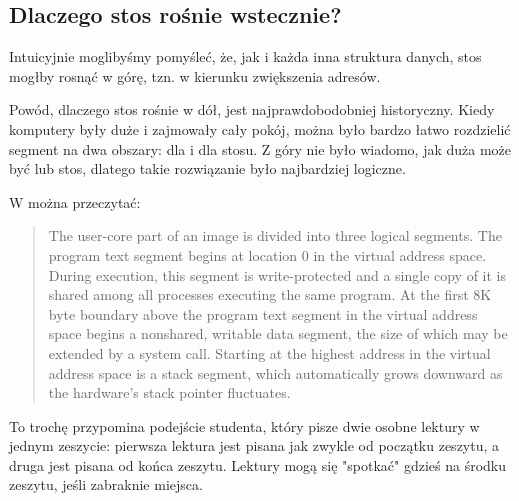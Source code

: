 \subsection{Dlaczego stos rośnie wstecznie?}
\label{stack_grow_backwards}

Intuicyjnie moglibyśmy pomyśleć, że, jak i każda inna struktura danych, stos mogłby rosnąć w górę, tzn. w kierunku zwiększenia adresów.

Powód, dlaczego stos rośnie w dół, jest najprawdobodobniej historyczny.
Kiedy komputery były duże i zajmowały cały pokój, można było bardzo łatwo rozdzielić segment na dwa obszary: dla  i dla stosu.
Z góry nie było wiadomo, jak duża może być  lub stos, dlatego takie rozwiązanie było najbardziej logiczne.



W \RitchieThompsonUNIX można przeczytać:

\begin{framed}
\begin{quotation}
The user-core part of an image is divided into three logical segments. The program text segment begins at location 0 in the virtual address space. During execution, this segment is write-protected and a single copy of it is shared among all processes executing the same program. At the first 8K byte boundary above the program text segment in the virtual address space begins a nonshared, writable data segment, the size of which may be extended by a system call. Starting at the highest address in the virtual address space is a stack segment, which automatically grows downward as the hardware's stack pointer fluctuates.
\end{quotation}
\end{framed}

To trochę przypomina podejście studenta,
który pisze dwie osobne lektury w jednym zeszycie:
pierwsza lektura jest pisana jak zwykle od początku zeszytu, a druga jest pisana od końca zeszytu.
Lektury mogą się "spotkać" gdzieś na środku zeszytu, jeśli zabraknie miejsca.


